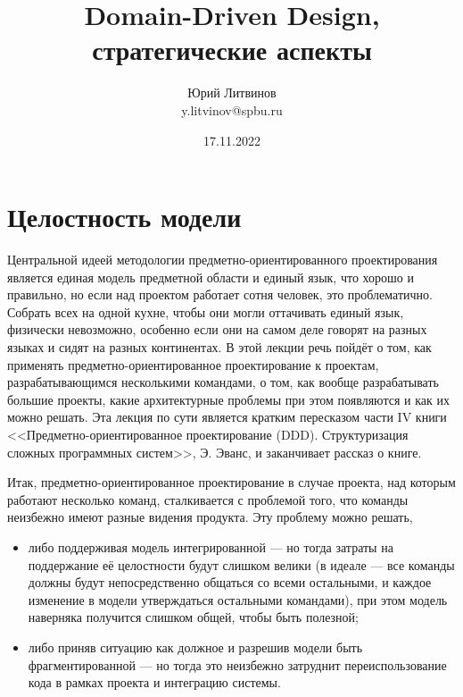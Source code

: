 \documentclass[a5paper]{article}
\title{Domain-Driven Design, стратегические аспекты}
\author{Юрий Литвинов\\\small{y.litvinov@spbu.ru}}
\date{17.11.2022}
\begin{document}
\maketitle
\thispagestyle{empty}

\section{Целостность модели}

Центральной идеей методологии предметно-ориентированного проектирования является единая модель предметной области и единый язык, что хорошо и правильно, но если над проектом работает сотня человек, это проблематично. Собрать всех на одной кухне, чтобы они могли оттачивать единый язык, физически невозможно, особенно если они на самом деле говорят на разных языках и сидят на разных континентах. В этой лекции речь пойдёт о том, как применять предметно-ориентированное проектирование к проектам, разрабатывающимся несколькими командами, о том, как вообще разрабатывать большие проекты, какие архитектурные проблемы при этом появляются и как их можно решать. Эта лекция по сути является кратким пересказом части IV книги <<Предметно-ориентированное проектирование (DDD). Структуризация сложных программных систем>>, Э. Эванс, и заканчивает рассказ о книге.

Итак, предметно-ориентированное проектирование в случае проекта, над которым работают несколько команд, сталкивается с проблемой того, что команды неизбежно имеют разные видения продукта. Эту проблему можно решать, 

\begin{itemize}
    \item либо поддерживая модель интегрированной --- но тогда затраты на поддержание её целостности будут слишком велики (в идеале --- все команды должны будут непосредственно общаться со всеми остальными, и каждое изменение в модели утверждаться остальными командами), при этом модель наверняка получится слишком общей, чтобы быть полезной;
    \item либо приняв ситуацию как должное и разрешив модели быть фрагментированной --- но тогда это неизбежно затруднит переиспользование кода в рамках проекта и интеграцию системы.
\end{itemize}
\end{document}
